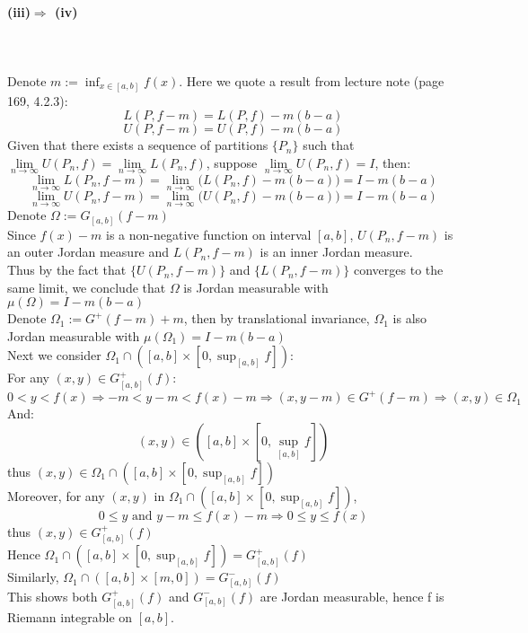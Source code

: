 \documentclass[11pt]{article}
\def\W{\Omega}
\def\to{\rightarrow}
\def\imply{\Longrightarrow}
\def\x{\times}
\def\oo{\infty}
\begin{document}
\paragraph{(iii)$\imply$ (iv)}~{} 
\\\\Denote $m:=\inf_{x\in [a,b]} f(x)$.
Here we quote a result from lecture note (page 169, 4.2.3):
$$L(P, f-m)=L(P,f)-m(b-a)$$
$$U(P, f-m)=U(P,f)-m(b-a)$$
Given that there exists a sequence of partitions $\{P_n\}$ such that $\lim\limits_{n\to \oo} U(P_n,f)=\lim\limits_{n\to \oo} L(P_n,f)$, suppose $\lim\limits_{n\to \oo} U(P_n,f)=I$, then:
 $$\lim\limits_{n\to\infty} L(P_n, f-m)=\lim\limits_{n\to \infty}\big(L(P_n,f)-m(b-a)\big)=I-m(b-a)$$
 $$\lim\limits_{n\to\infty} U(P_n, f-m)=\lim\limits_{n\to \infty}\big(U(P_n,f)-m(b-a)\big)=I-m(b-a)$$
Denote $\W:=G_{[a,b]}(f-m)$
\\Since $f(x)-m$ is a non-negative function on interval $[a, b]$, $U(P_n, f-m)$ is an outer Jordan measure and $L(P_n, f-m)$ is an inner Jordan measure.
\\Thus by the fact that $\{U(P_n,f-m)\}$ and $\{L(P_n, f-m)\}$ converges to the same limit, we conclude that $\W$ is Jordan measurable with $\mu(\W)=I-m(b-a)$
\\Denote $\W_1:=G^+(f-m)+m$, then by translational invariance, $\W_1$ is also Jordan measurable with $\mu (\W_1)=I-m(b-a)$
\\Next we consider $\W_1 \cap ([a,b]\x[0, \sup_{[a, b]}f])$:
\\For any $(x, y) \in G_{[a,b]}^+(f)$: 
$$0<y<f(x)\imply -m<y-m<f(x)-m\imply (x,y-m)\in G^+(f-m)\imply (x, y)\in \W_1$$ 
And:
$$(x,y)\in ([a,b]\times[0, \sup_{[a,b]}f])$$
thus $(x, y)\in \W_1 \cap ([a,b]\x[0, \sup_{[a, b]}f])$
\\Moreover, for any $(x, y)$ in $\W_1 \cap ([a,b]\x[0, \sup_{[a, b]}f])$, 
$$0\le y \text{ and } y-m\le f(x)-m \imply 0\le y\le f(x)$$
thus $(x, y)\in G_{[a,b]}^+(f)$
\\Hence $\W_1 \cap ([a,b]\x[0, \sup_{[a, b]}f])=G_{[a,b]}^+(f)$
\\Similarly, $\W_1 \cap ([a,b]\x[m, 0])=G_{[a,b]}^-(f)$
\\This shows both $G_{[a,b]}^+(f)$ and $G_{[a,b]}^-(f)$ are Jordan measurable, hence f is Riemann integrable on $[a,b]$.
\end{document}
